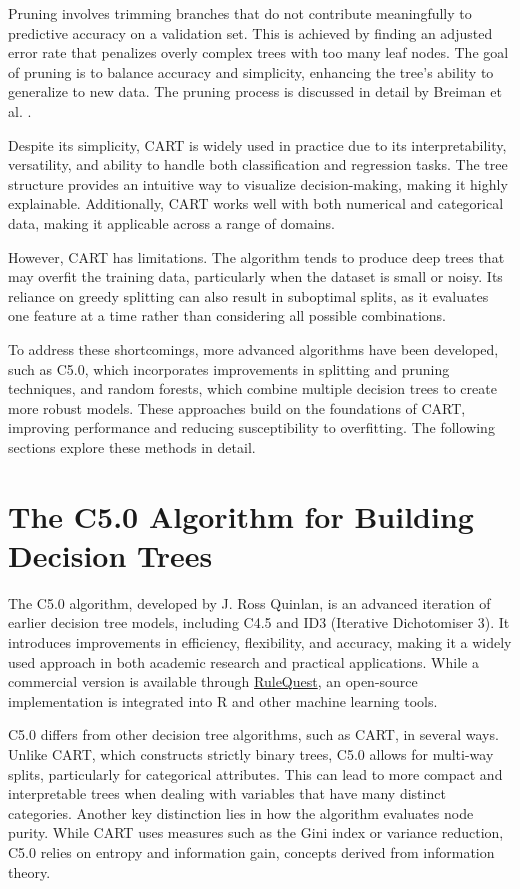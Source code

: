 \documentclass[
]{book}
\theoremstyle{definition}
\theoremstyle{definition}
\theoremstyle{definition}
\theoremstyle{definition}
\theoremstyle{remark}
\begin{document}
Pruning involves trimming branches that do not contribute meaningfully to predictive accuracy on a validation set. This is achieved by finding an adjusted error rate that penalizes overly complex trees with too many leaf nodes. The goal of pruning is to balance accuracy and simplicity, enhancing the tree's ability to generalize to new data. The pruning process is discussed in detail by Breiman et al. \citep{breiman1984classification}.

Despite its simplicity, CART is widely used in practice due to its interpretability, versatility, and ability to handle both classification and regression tasks. The tree structure provides an intuitive way to visualize decision-making, making it highly explainable. Additionally, CART works well with both numerical and categorical data, making it applicable across a range of domains.

However, CART has limitations. The algorithm tends to produce deep trees that may overfit the training data, particularly when the dataset is small or noisy. Its reliance on greedy splitting can also result in suboptimal splits, as it evaluates one feature at a time rather than considering all possible combinations.

To address these shortcomings, more advanced algorithms have been developed, such as C5.0, which incorporates improvements in splitting and pruning techniques, and random forests, which combine multiple decision trees to create more robust models. These approaches build on the foundations of CART, improving performance and reducing susceptibility to overfitting. The following sections explore these methods in detail.

\section{The C5.0 Algorithm for Building Decision Trees}\label{the-c5.0-algorithm-for-building-decision-trees}

The C5.0 algorithm, developed by J. Ross Quinlan, is an advanced iteration of earlier decision tree models, including C4.5 and ID3 (Iterative Dichotomiser 3). It introduces improvements in efficiency, flexibility, and accuracy, making it a widely used approach in both academic research and practical applications. While a commercial version is available through \href{http://www.rulequest.com/}{RuleQuest}, an open-source implementation is integrated into R and other machine learning tools.

C5.0 differs from other decision tree algorithms, such as CART, in several ways. Unlike CART, which constructs strictly binary trees, C5.0 allows for multi-way splits, particularly for categorical attributes. This can lead to more compact and interpretable trees when dealing with variables that have many distinct categories. Another key distinction lies in how the algorithm evaluates node purity. While CART uses measures such as the Gini index or variance reduction, C5.0 relies on entropy and information gain, concepts derived from information theory.
\end{document}
